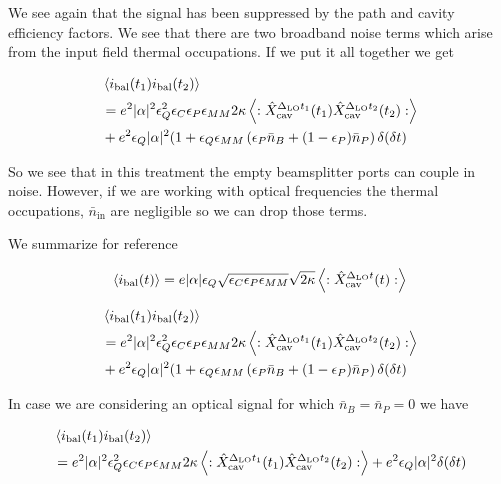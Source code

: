 \documentclass[12pt]{article}
\newcommand{\ep}{\epsilon}
\begin{document}
We see again that the signal has been suppressed by the path and cavity efficiency factors. We see that there are two broadband noise terms which arise from the input field thermal occupations. If we put it all together we get

\begin{align}
&\Braket{i_{\text{bal}}(t_1)i_{\text{bal}}(t_2)}\\
&= e^2 |\alpha|^2 \ep_Q^2 \ep_C \ep_P \ep_{MM} 2\kappa \Braket{:\hat{X}_{\text{cav}}^{\Delta_{\text{LO}}t_1}(t_1)\hat{X}_{\text{cav}}^{\Delta_{\text{LO}}t_2}(t_2) :}\\
&+ e^2 \ep_Q |\alpha|^2(1+\ep_Q\ep_{MM}\left(\ep_P\bar{n}_B + (1-\ep_P)\bar{n}_P\right) \delta(\delta t)
\end{align}

So we see that in this treatment the empty beamsplitter ports can couple in noise. However, if we are working with optical frequencies the thermal occupations, $\bar{n}_{\text{in}}$ are negligible so we can drop those terms.

We summarize for reference

\begin{align}
\Braket{i_{\text{bal}}(t)} &= e|\alpha|\ep_Q \sqrt{\ep_C \ep_P \ep_{MM}} \sqrt{2\kappa} \Braket{:\hat{X}_{\text{cav}}^{\Delta_{\text{LO}}t}(t):}\\
\end{align}

\begin{align}
&\Braket{i_{\text{bal}}(t_1)i_{\text{bal}}(t_2)}\\
&= e^2 |\alpha|^2 \ep_Q^2 \ep_C \ep_P \ep_{MM} 2\kappa \Braket{:\hat{X}_{\text{cav}}^{\Delta_{\text{LO}}t_1}(t_1)\hat{X}_{\text{cav}}^{\Delta_{\text{LO}}t_2}(t_2) :}\\
&+ e^2 \ep_Q |\alpha|^2(1+\ep_Q\ep_{MM}\left(\ep_P\bar{n}_B + (1-\ep_P)\bar{n}_P\right) \delta(\delta t)
\end{align}

In case we are considering an optical signal for which $\bar{n}_B = \bar{n}_P=0$ we have

\begin{align}
&\Braket{i_{\text{bal}}(t_1)i_{\text{bal}}(t_2)}\\
&= e^2 |\alpha|^2 \ep_Q^2 \ep_C \ep_P \ep_{MM} 2\kappa \Braket{:\hat{X}_{\text{cav}}^{\Delta_{\text{LO}}t_1}(t_1)\hat{X}_{\text{cav}}^{\Delta_{\text{LO}}t_2}(t_2) :} + e^2 \ep_Q |\alpha|^2\delta(\delta t)
\end{align}
\end{document}
